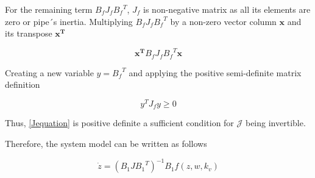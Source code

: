 For the remaining term $B_f J_f {B_f}^T$, $J_f$ is non-negative matrix as all its elements are zero or pipe´s inertia. 
Multiplying $B_f J_f {B_f}^T$ by a non-zero vector column $\mathbf{x}$ and its transpose $\mathbf{x^{T}}$

\begin{equation}
  \mathbf{x^{T}} B_f J_f {B_f}^T \mathbf{x}
  \label{PosDefi}
\end{equation}

Creating a new variable $y = {B_f}^T$ and applying the positive semi-definite matrix definition

\begin{equation}
  y^{T} J_f y \geqslant 0
  \label{PosDefEq}
\end{equation}

Thus, \eqref{Jequation} is positive definite a sufficient condition for $\mathcal{J}$ being invertible. 

Therefore, the system model can be written as follows

\begin{equation}
   \dot{z}  = (B_1 J {B_1}^T)^{-1}B_1 f(z, w, k_v)
   \label{ParatModelFinal}
 \end{equation}


